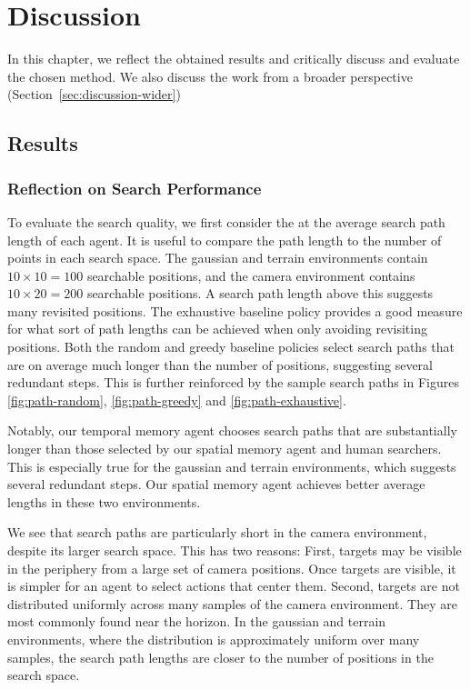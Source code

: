 \chapter{Discussion}
\label{cha:discussion}

In this chapter, we reflect the obtained results and critically discuss and evaluate the chosen method.
We also discuss the work from a broader perspective (Section~\ref{sec:discussion-wider})

\section{Results}
\label{sec:discussion-results}



\subsection{Reflection on Search Performance}

To evaluate the search quality, we first consider the at the average search path length of each agent.
It is useful to compare the path length to the number of points in each search space.
The gaussian and terrain environments contain \(10 \times 10 = 100\) searchable positions, and the camera environment contains \(10 \times 20 = 200\) searchable positions.
A search path length above this suggests many revisited positions.
The exhaustive baseline policy provides a good measure for what sort of path lengths can be achieved when only avoiding revisiting positions.
Both the random and greedy baseline policies select search paths that are on average much longer than the number of positions, suggesting several redundant steps.
This is further reinforced by the sample search paths in Figures \ref{fig:path-random}, \ref{fig:path-greedy} and \ref{fig:path-exhaustive}.

Notably, our temporal memory agent chooses search paths that are substantially longer than those selected by our spatial memory agent and human searchers.
This is especially true for the gaussian and terrain environments, which suggests several redundant steps.
Our spatial memory agent achieves better average lengths in these two environments.

We see that search paths are particularly short in the camera environment,
despite its larger search space.
This has two reasons:
First, targets may be visible in the periphery from a large set of camera positions.
Once targets are visible, it is simpler for an agent to select actions that center them.
Second, targets are not distributed uniformly across many samples of the camera environment.
They are most commonly found near the horizon.
In the gaussian and terrain environments, where the distribution is approximately uniform over many samples, the search path lengths are closer to the number of positions in the search space.

